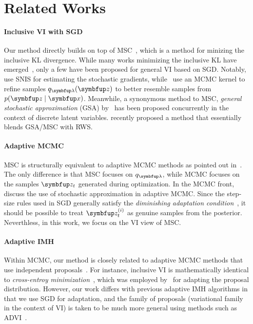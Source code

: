
\section{Related Works}
\paragraph{Inclusive VI with SGD}
Our method directly builds on top of MSC~\citep{NEURIPS2020_b2070693}, which is a method for minizing the inclusive KL divergence.
While many works minimizing the inclusive KL have emerged~\citep{DBLP:journals/corr/BornscheinB14, li_approximate_2017, 10.5555/2074022.2074067, pmlr-v124-ou20a, kim2021adaptive}, only a few have been proposed for general VI based on SGD.
Notably,~\citet{DBLP:journals/corr/BornscheinB14} use SNIS for estimating the stochastic gradients, while~\citet{li_approximate_2017} use an MCMC kernel to refine samples \(q_{\vlambda}(\vz)\) to better resemble samples from \(p(\vz\mid\vx)\).
Meanwhile, a synonymous method to MSC, \textit{general stochastic approximation} (GSA) by~\citet[Algorithm 1]{pmlr-v124-ou20a} has been proposed concurrently in the context of discrete latent variables.
\citet{kim2021adaptive} recently proposed a method that essentially blends GSA/MSC with RWS.

\vspace{-0.1in}
\paragraph{Adaptive MCMC}
MSC is structurally equivalent to adaptive MCMC methods as pointed out in~\cite{pmlr-v124-ou20a}.
The only difference is that MSC focuses on \(q_{\vlambda}\), while MCMC focuses on the samples \(\vz_t\) generated during optimization.
In the MCMC front, \citet{10.1007/s11222-008-9110-y, garthwaite_adaptive_2016} discuss the use of stochastic approximation in adaptive MCMC.
Since the step-size rules used in SGD generally satisfy the \textit{diminishing adaptation condition}~\cite{10.1007/s11222-008-9110-y}, it should be possible to treat \(\vz^{(i)}_t\) as genuine samples from the posterior.
Neverthless, in this work, we focus on the VI view of MSC.

\vspace{-0.1in}
\paragraph{Adaptive IMH}
Within MCMC, our method is closely related to adaptive MCMC methods that use independent proposals~\citep{andrieu_ergodicity_2006, keith_adaptive_2008, holden_adaptive_2009, giordani_adaptive_2010}.
For instance, inclusive VI is mathematically identical to \textit{cross-entroy minimization}~\citet{barbakh_cross_2009}, which was employed by~\citet{keith_adaptive_2008} for adapting the proposal distribution.
However, our work differs with previous adaptive IMH algorithms in that we use SGD for adaptation, and the family of proposals (variational family in the context of VI) is taken to be much more general using methods such as ADVI~\citep{JMLR:v18:16-107}.

